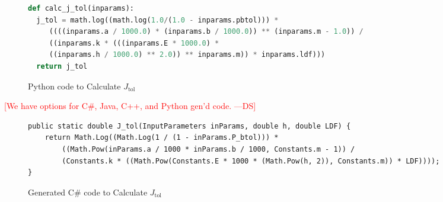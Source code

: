 \documentclass[sigconf]{acmart}
\newcommand{\authornt}[3]{\textcolor{#1}{[#3 ---#2]}}
\newcommand{\authornt}[3]{}
\newcommand{\ds}[1]{\authornt{red}{DS}{#1}} %
\newcommand{\spr}[1]{\authornt{green}{SP}{#1}} %
\newcommand{\jtol}{$J_{\mbox{tol}}$}
\begin{document}
 \begin{figure*}
 \begin{lstlisting}[language=python, frame=single, showstringspaces=false, basicstyle=\small]
def calc_j_tol(inparams):
  j_tol = math.log((math.log(1.0/(1.0 - inparams.pbtol))) * 
     ((((inparams.a / 1000.0) * (inparams.b / 1000.0)) ** (inparams.m - 1.0)) / 
     ((inparams.k * (((inparams.E * 1000.0) * 
     ((inparams.h / 1000.0) ** 2.0)) ** inparams.m)) * inparams.ldf))) 
  return j_tol
 \end{lstlisting}
 \caption{Python code to Calculate \jtol{}}
 \label{Fig_JtolPython}
 \end{figure*}
 
\ds{We have options for C\#, Java, C++, and Python gen'd code.}
\begin{figure*}
\begin{lstlisting}[frame=single, showstringspaces=false, basicstyle=\small]
public static double J_tol(InputParameters inParams, double h, double LDF) {
    return Math.Log((Math.Log(1 / (1 - inParams.P_btol))) * 
        ((Math.Pow(inParams.a / 1000 * inParams.b / 1000, Constants.m - 1)) / 
        (Constants.k * ((Math.Pow(Constants.E * 1000 * (Math.Pow(h, 2)), Constants.m)) * LDF))));
}
 \end{lstlisting}
 \caption{Generated C\# code to Calculate \jtol{}}
 \label{Fig_JtolCS}
 \end{figure*}
 


\end{document}
